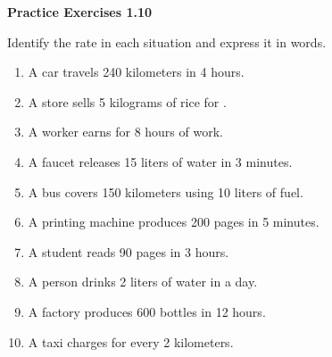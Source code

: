 \vspace{0.3ex}
\noindent\textbf{Practice Exercises 1.10}

\vspace{0.2ex}

Identify the rate in each situation and express it in words.
\begin{enumerate}
    \item A car travels 240 kilometers in 4 hours.
    \item A store sells 5 kilograms of rice for  .
    \item A worker earns  for 8 hours of work.
    \item A faucet releases 15 liters of water in 3 minutes.
    \item A bus covers 150 kilometers using 10 liters of fuel.
    \item A printing machine produces 200 pages in 5 minutes.
    \item A student reads 90 pages in 3 hours.
    \item A person drinks 2 liters of water in a day.
    \item A factory produces 600 bottles in 12 hours.
    \item A taxi charges  for every 2 kilometers.
\end{enumerate}
